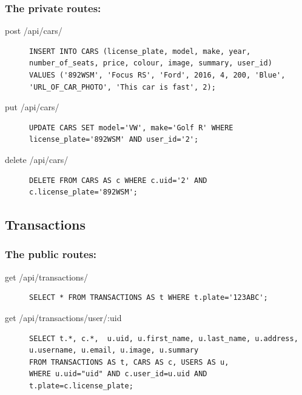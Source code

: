 \documentclass{article}
\begin{document}
\subsubsection{The private routes:}
\begin{description}
\item[post /api/cars/] \mbox{}
\begin{lstlisting}[style=sql]
INSERT INTO CARS (license_plate, model, make, year, number_of_seats, price, colour, image, summary, user_id)
VALUES ('892WSM', 'Focus RS', 'Ford', 2016, 4, 200, 'Blue', 'URL_OF_CAR_PHOTO', 'This car is fast', 2);
\end{lstlisting}
\item[put /api/cars/] \mbox{}
\begin{lstlisting}[style=sql]
UPDATE CARS SET model='VW', make='Golf R' WHERE license_plate='892WSM' AND user_id='2';
\end{lstlisting}
\item[delete /api/cars/] \mbox{}
\begin{lstlisting}[style=sql]
DELETE FROM CARS AS c WHERE c.uid='2' AND c.license_plate='892WSM';
\end{lstlisting}
\end{description}

\subsection{Transactions}
\subsubsection{The public routes:}
\begin{description}
\item[get /api/transactions/] \mbox{}
\begin{lstlisting}[style=sql]
SELECT * FROM TRANSACTIONS AS t WHERE t.plate='123ABC';
\end{lstlisting}
\item[get /api/transactions/user/:uid] \mbox{}
\begin{lstlisting}[style=sql]
SELECT t.*, c.*,  u.uid, u.first_name, u.last_name, u.address, u.username, u.email, u.image, u.summary
FROM TRANSACTIONS AS t, CARS AS c, USERS AS u,
WHERE u.uid="uid" AND c.user_id=u.uid AND t.plate=c.license_plate;
\end{lstlisting}
\end{description}
\end{document}
